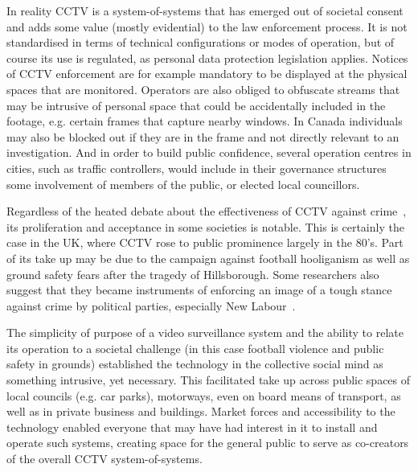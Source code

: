 \documentclass{llncs}
\begin{document}
In reality CCTV is a system-of-systems that has emerged out of societal consent and adds some value (mostly evidential) to the law enforcement process. It is not standardised in terms of technical configurations or modes of operation, but of course its use is regulated, as personal data protection legislation applies. Notices of CCTV enforcement are for example mandatory to be displayed at the physical spaces that are monitored. Operators are also obliged to obfuscate streams that may be intrusive of personal space that could be accidentally included in the footage, e.g. certain frames that capture nearby windows. In Canada individuals may also be blocked out if they are in the frame and not directly relevant to an investigation. And in order to build public confidence, several operation centres in cities, such as traffic controllers, would include in their governance structures some involvement of members of the public, or elected local councillors.

Regardless of the heated debate about the effectiveness of CCTV against crime~\cite{Ditton}\cite{Woodhouse}, its proliferation and acceptance in some societies is notable. This is certainly the case in the UK, where CCTV rose to public prominence largely in the 80's. Part of its take up may be due to the campaign against football hooliganism as well as ground safety fears after the tragedy of Hillsborough. Some researchers also suggest that they became instruments of enforcing an image of a tough stance against crime by political parties, especially New Labour~\cite{McHill}.

The simplicity of purpose of a video surveillance system and the ability to relate its operation to a societal challenge (in this case football violence and public safety in grounds) established the technology in the collective social mind as something intrusive, yet necessary. This facilitated take up across public spaces of local councils (e.g. car parks), motorways, even on board means of transport, as well as in private business and buildings. Market forces and accessibility to the technology enabled everyone that may have had interest in it to install and operate such systems, creating space for the general public to serve as co-creators of the overall CCTV system-of-systems.
\end{document}
